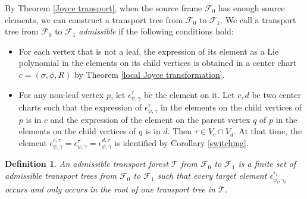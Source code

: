 \documentclass[a4paper,12pt]{amsart}
\numberwithin{equation}{section}
\newtheorem{definition}[theorem]{Definition}
\newcommand{\1}{\mathbf{1}}
\begin{document}
\par\medskip
\noindent\begin{minipage}{\linewidth}
\centering
{}
\label{fig:scattering-substitution-tree}
\end{minipage}
\par\medskip

By Theorem \ref{Joyce transport}, when the source frame $\mathscr{F}_0$ has enough source elements, we can construct a transport tree from $\mathscr{F}_0$ to $\mathscr{F}_1$. We call a transport tree from $\mathscr{F}_0$ to $\mathscr{F}_1$ \emph{admissible} if the following conditions hold:
\begin{itemize}
    \item For each vertex that is not a leaf, the expression of its element as a Lie polynomial in the elements on its child vertices is obtained in a center chart $c=(\sigma,\phi,R)$ by Theorem \ref{local Joyce transformation}.
    \item For any non-leaf vertex $p$, let $\epsilon^\tau_{\psi,\gamma}$ be the element on it. Let $c,d$ be two center charts such that the expression of $\epsilon^\tau_{\psi,\gamma}$ in the elements on the child vertices of $p$ is in $c$ and the expression of the element on the parent vertex $q$ of $p$ in the elements on the child vertices of $q$ is in $d$. Then $\tau\in V_c\cap V_d$. At that time, the element $\epsilon^{c,\tau}_{\psi,\gamma}=\epsilon^\tau_{\psi,\gamma}=\epsilon^{d,\tau}_{\psi,\gamma}$ is identified by Corollary \ref{switching}. 
\end{itemize}
\begin{definition}
    An \emph{admissible transport forest} $\mathscr{T}$ from $\mathscr{F}_0$ to $\mathscr{F}_1$ is a finite set of admissible transport trees from $\mathscr{F}_0$ to $\mathscr{F}_1$ such that every target element $\epsilon^{\tau_1}_{\psi_i,\gamma_i}$ occurs and only occurs in the root of one transport tree in $\mathscr{T}$.
\end{definition}
    
\end{document}
